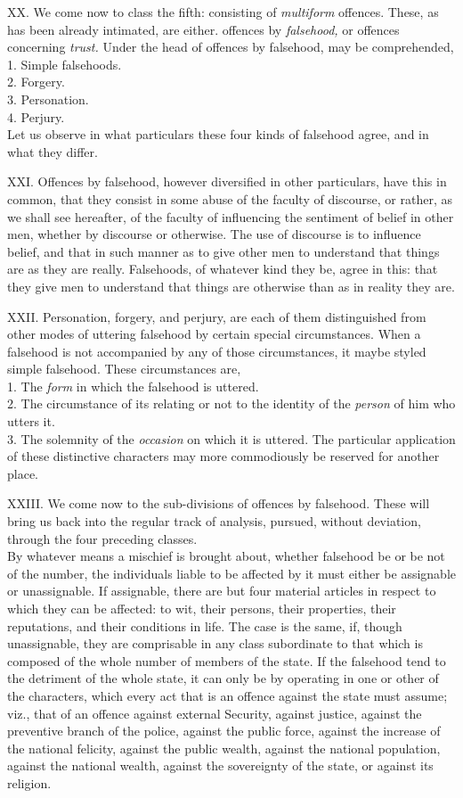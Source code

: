 \documentclass[12pt]{report}
\begin{document}
XX. We come now to class the fifth: consisting of \emph{multiform}
offences. These, as has been already intimated, are either. offences by
\emph{falsehood,} or offences concerning \emph{trust.} Under the head of
offences by falsehood, may be comprehended,\\
1. Simple falsehoods.\\
2. Forgery.\\
3. Personation.\\
4. Perjury.\\
Let us observe in what particulars these four kinds of falsehood agree,
and in what they differ.

XXI. Offences by falsehood, however diversified in other particulars,
have this in common, that they consist in some abuse of the faculty of
discourse, or rather, as we shall see hereafter, of the faculty of
influencing the sentiment of belief in other men, whether by discourse
or otherwise. The use of discourse is to influence belief, and that in
such manner as to give other men to understand that things are as they
are really. Falsehoods, of whatever kind they be, agree in this: that
they give men to understand that things are otherwise than as in reality
they are.

XXII. Personation, forgery, and perjury, are each of them distinguished
from other modes of uttering falsehood by certain special circumstances.
When a falsehood is not accompanied by any of those circumstances, it
maybe styled simple falsehood. These circumstances are,\\
1. The \emph{form} in which the falsehood is uttered.\\
2. The circumstance of its relating or not to the identity of the
\emph{person} of him who utters it.\\
3. The solemnity of the \emph{occasion} on which it is uttered. The
particular application of these distinctive characters may more
commodiously be reserved for another place.

XXIII. We come now to the sub-divisions of offences by falsehood. These
will bring us back into the regular track of analysis, pursued, without
deviation, through the four preceding classes.\\
By whatever means a mischief is brought about, whether falsehood be or
be not of the number, the individuals liable to be affected by it must
either be assignable or unassignable. If assignable, there are but four
material articles in respect to which they can be affected: to wit,
their persons, their properties, their reputations, and their conditions
in life. The case is the same, if, though unassignable, they are
comprisable in any class subordinate to that which is composed of the
whole number of members of the state. If the falsehood tend to the
detriment of the whole state, it can only be by operating in one or
other of the characters, which every act that is an offence against the
state must assume; viz., that of an offence against external Security,
against justice, against the preventive branch of the police, against
the public force, against the increase of the national felicity, against
the public wealth, against the national population, against the national
wealth, against the sovereignty of the state, or against its religion.
\end{document}
